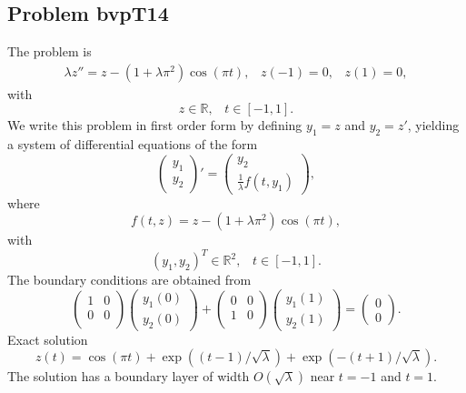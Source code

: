 \documentclass[<options>]{article}
\def \RR {{\mathbb{R}}}
\begin{document}
\subsection{Problem bvpT14}\label{test14}
The problem is 
\begin{eqnarray*}
\lambda z'' = z  - (1 +\lambda \pi^{2}) \cos(\pi t), \;\;\;z(-1) = 0, \;\;\; z(1) = 0,
\end{eqnarray*}
with
\[
z \in \RR, \;\;\; t\in [-1,1].
\]
We write this problem in first order form by defining $y_1=z$ and $y_2=z'$, yielding a system of differential equations of the form
\begin{equation*}
\left(\begin{array}{c}
y_1\\
y_2
\end{array}\right)'=
\left(\begin{array}{c}
y_2\\
\frac{1}{\lambda}f(t,y_1)
\end{array}\right),
\end{equation*}
where
\begin{equation*}
 f(t,z) = z  - (1 +\lambda \pi^{2}) \cos(\pi t),
\end{equation*}
with
\[
(y_1,y_2)^T \in \RR^{2}, \;\;\;  t \in [-1,1].
\]
The  boundary conditions are obtained from
\begin{equation*}
\left(
  \begin{array}{cc}
    1 & 0 \\
    0 & 0 \\
  \end{array}
\right)
\left(\begin{array}{c}
y_{1}(0)\\
y_{2}(0)
\end{array}\right)
+
\left(
  \begin{array}{cc}
    0 & 0 \\
    1 & 0 \\
  \end{array}
\right)
\left(\begin{array}{c}
y_{1}(1)\\
y_{2}(1)
\end{array}\right)=\left(\begin{array}{c}
0 \\
0
\end{array}\right).
\end{equation*}
\textrm{Exact solution}
$$z(t) =  \cos(\pi t) +  \exp((t - 1) / \sqrt\lambda) + \exp(-(t + 1) / \sqrt\lambda).$$
The solution has a boundary layer of width $O(\sqrt\lambda)$  near $t = -1$ and $t = 1.$
\end{document}
